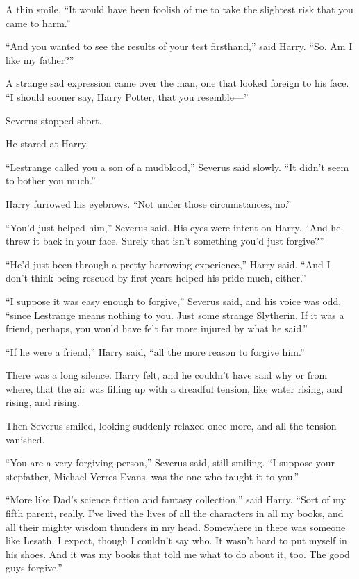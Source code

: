 A thin smile. “It would have been foolish of me to take the slightest risk that
you came to harm.”

“And you wanted to see the results of your test firsthand,” said Harry. “So. Am
I like my father?”

A strange sad expression came over the man, one that looked foreign to his
face. “I should sooner say, Harry Potter, that you resemble—”

Severus stopped short.

He stared at Harry.

“Lestrange called you a son of a mudblood,” Severus said slowly. “It didn’t
seem to bother you much.”

Harry furrowed his eyebrows. “Not under those circumstances, no.”

“You’d just helped him,” Severus said. His eyes were intent on Harry. “And he
threw it back in your face. Surely that isn’t something you’d just forgive?”

“He’d just been through a pretty harrowing experience,” Harry said. “And I
don’t think being rescued by first-years helped his pride much, either.”

“I suppose it was easy enough to forgive,” Severus said, and his voice was odd,
“since Lestrange means nothing to you. Just some strange Slytherin. If it was a
friend, perhaps, you would have felt far more injured by what he said.”

“If he were a friend,” Harry said, “all the more reason to forgive him.”

There was a long silence. Harry felt, and he couldn’t have said why or from
where, that the air was filling up with a dreadful tension, like water rising,
and rising, and rising.

Then Severus smiled, looking suddenly relaxed once more, and all the tension
vanished.

“You are a very forgiving person,” Severus said, still smiling. “I suppose your
stepfather, Michael Verres-Evans, was the one who taught it to you.”

“More like Dad’s science fiction and fantasy collection,” said Harry. “Sort of
my fifth parent, really. I’ve lived the lives of all the characters in all my
books, and all their mighty wisdom thunders in my head. Somewhere in there was
someone like Lesath, I expect, though I couldn’t say who. It wasn’t hard to put
myself in his shoes. And it was my books that told me what to do about it, too.
The good guys forgive.”


